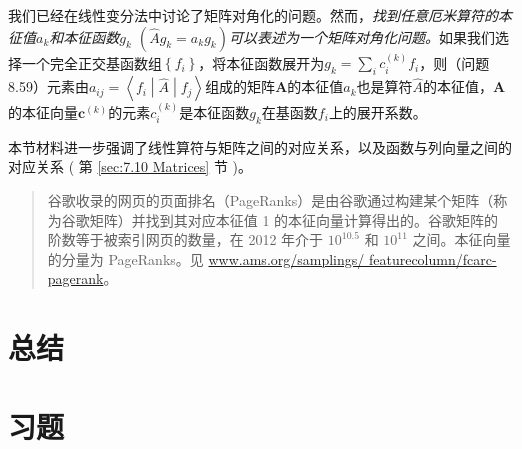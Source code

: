     我们已经在线性变分法中讨论了矩阵对角化的问题。然而，\textit{找到任意厄米算符的本征值$a_k$和本征函数$g_k$ $\left(\hat{A}g_k = a_kg_k\right)$可以表述为一个矩阵对角化问题。}如果我们选择一个完全正交基函数组$\left\{f_i\right\}$，将本征函数展开为$g_k = \sum_{i}c_i^{\left(k\right)}f_i$，则（问题8.59）元素由$a_{ij} = \left\langle f_i \middle| \hat{A} \middle| f_j \right\rangle$组成的矩阵$\mathbf{A}$的本征值$a_k$也是算符$\hat{A}$的本征值，$\mathbf{A}$的本征向量$\mathbf{c}^{\left(k\right)}$的元素$c_i^{\left(k\right)}$是本征函数$g_k$在基函数$f_i$上的展开系数。

    本节材料进一步强调了线性算符与矩阵之间的对应关系，以及函数与列向量之间的对应关系 ( 第 \ref{sec:7.10 Matrices} 节 )。

    \begin{quote}
        \small
        \noindent  谷歌收录的网页的页面排名（PageRanks）是由谷歌通过构建某个矩阵（称为谷歌矩阵）并找到其对应本征值 1 的本征向量计算得出的。谷歌矩阵的阶数等于被索引网页的数量，在 2012 年介于 $10^{10.5}$ 和 $10^{11}$ 之间。本征向量的分量为 PageRanks。见 \url{www.ams.org/samplings/ featurecolumn/fcarc-pagerank}。
    \end{quote}

\section*{总结}

\section*{习题}